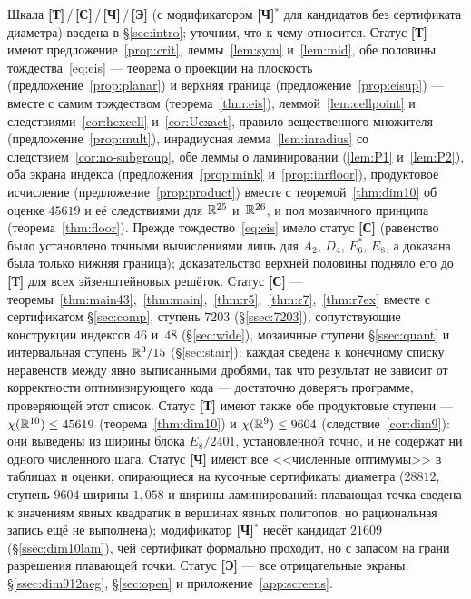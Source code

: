 Шкала \textbf{[Т]}\,/\,\textbf{[С]}\,/\,\textbf{[Ч]}\,/\,\textbf{[Э]} (с
модификатором \textbf{[Ч]}${}^{*}$ для кандидатов без сертификата диаметра)
введена в \S\ref{sec:intro}; уточним, что к чему относится. Статус \textbf{[Т]} имеют
предложение~\ref{prop:crit}, леммы~\ref{lem:sym} и~\ref{lem:mid}, обе половины
тождества~\eqref{eq:eis} --- теорема о проекции на плоскость
(предложение~\ref{prop:planar}) и верхняя граница
(предложение~\ref{prop:eisup}) --- вместе с самим
тождеством (теорема~\ref{thm:eis}), леммой~\ref{lem:cellpoint} и
следствиями~\ref{cor:hexcell} и~\ref{cor:Uexact}, правило вещественного
множителя (предложение~\ref{prop:mult}), инрадиусная лемма~\ref{lem:inradius}
со следствием~\ref{cor:no-subgroup}, обе леммы о ламинировании
(\ref{lem:P1} и~\ref{lem:P2}), оба
экрана индекса (предложения~\ref{prop:mink} и~\ref{prop:inrfloor}),
продуктовое исчисление (предложение~\ref{prop:product}) вместе с
теоремой~\ref{thm:dim10} об оценке $45619$ и её следствиями для $\mathbb{R}^{25}$
и~$\mathbb{R}^{26}$, и пол мозаичного
принципа (теорема~\ref{thm:floor}). Прежде тождество~\eqref{eq:eis} имело
статус \textbf{[С]} (равенство было установлено точными вычислениями лишь для
$A_2$, $D_4$, $E_6^*$, $E_8$, а доказана была только нижняя граница);
доказательство верхней половины подняло его до \textbf{[Т]} для всех
эйзенштейновых решёток. Статус
\textbf{[С]} --- теоремы~\ref{thm:main43},~\ref{thm:main},~\ref{thm:r5},~\ref{thm:r7},~\ref{thm:r7ex} вместе с
сертификатом \S\ref{sec:comp}, ступень $7203$ (\S\ref{ssec:7203}), сопутствующие конструкции индексов $46$ и~$48$
(\S\ref{sec:wide}), мозаичные ступени \S\ref{ssec:quant} и
интервальная ступень $\mathbb{R}^3/15$ (\S\ref{sec:stair}): каждая
сведена к конечному списку неравенств между явно выписанными дробями, так что
результат не зависит от корректности оптимизирующего кода --- достаточно
доверять программе, проверяющей этот список. Статус \textbf{[Т]} имеют также обе продуктовые
ступени --- $\chi(\mathbb{R}^{10})\le45619$ (теорема~\ref{thm:dim10}) и
$\chi(\mathbb{R}^9)\le9604$ (следствие~\ref{cor:dim9}): они выведены из ширины блока
$E_8/2401$, установленной точно, и не содержат ни одного численного шага.
Статус \textbf{[Ч]} имеют все
<<численные оптимумы>> в таблицах и оценки, опирающиеся на кусочные
сертификаты диаметра ($28812$, ступень $9604$ ширины
$1{,}058$ и ширины ламинирований: плавающая точка сведена к значениям явных
квадратик в вершинах явных политопов, но рациональная запись ещё не
выполнена); модификатор
\textbf{[Ч]}${}^{*}$ несёт кандидат $21609$ (\S\ref{ssec:dim10lam}), чей
сертификат формально проходит, но с запасом на грани разрешения плавающей
точки. Статус \textbf{[Э]} ---
все отрицательные экраны: \S\ref{ssec:dim912neg}, \S\ref{sec:open} и
приложение~\ref{app:screens}.

